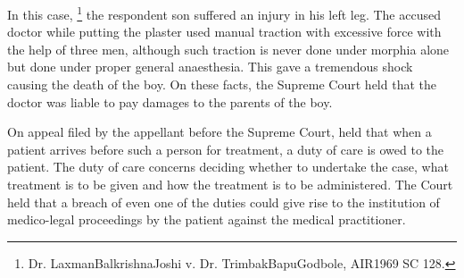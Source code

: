 \begin{multicols}{2}


\vspace{-.12cm}

\noi
In this case, \footnote{Dr. LaxmanBalkrishnaJoshi v. Dr. TrimbakBapuGodbole, AIR1969 SC 128.} the respondent son suffered an injury in his left leg. The accused doctor while putting the plaster used manual traction with excessive force with the help of three men, although such traction is never done under morphia alone but done under proper general anaesthesia. This gave a tremendous shock causing the death of the boy. On these facts, the Supreme Court held that the doctor was liable to pay damages to the parents of the boy.

\vspace{-.12cm}

\noi
On appeal filed by the appellant before the Supreme Court, held that when a patient arrives before
such a person for treatment, a duty of care is owed to the patient. The duty of care concerns
deciding whether to undertake the case, what treatment is to be given and how the treatment is to
be administered. The Court held that a breach of even one of the duties could give rise to the
institution of medico-legal proceedings by the patient against the medical practitioner.

\vspace{-.12cm}


\vspace{-.12cm}


\end{multicols}
